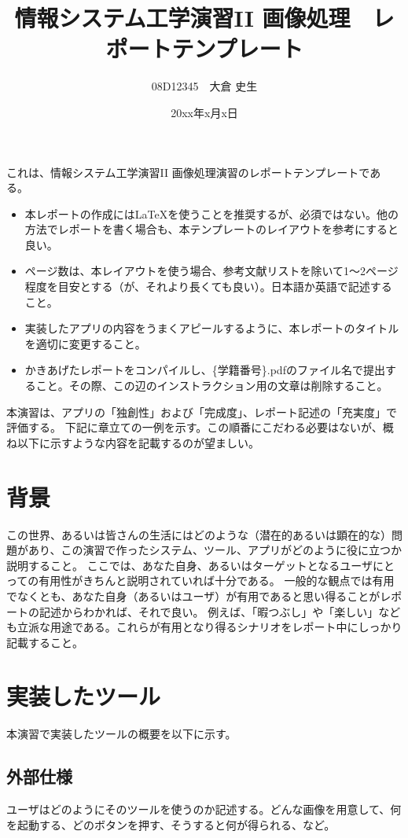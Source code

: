 \documentclass[twocolumn, a4paper]{jsarticle}
\begin{document}
\title{情報システム工学演習II 画像処理　レポートテンプレート}
\author{08D12345　大倉 史生}
\date{20xx年x月x日} 
\twocolumn[
\maketitle
]

これは、情報システム工学演習II 画像処理演習のレポートテンプレートである。
\begin{itemize}
\item 本レポートの作成には\LaTeX を使うことを推奨するが、必須ではない。他の方法でレポートを書く場合も、本テンプレートのレイアウトを参考にすると良い。
\item ページ数は、本レイアウトを使う場合、参考文献リストを除いて1～2ページ程度を目安とする（が、それより長くても良い）。日本語か英語で記述すること。
\item 実装したアプリの内容をうまくアピールするように、本レポートのタイトルを適切に変更すること。
\item かきあげたレポートをコンパイルし、\{学籍番号\}.pdfのファイル名で提出すること。その際、この辺のインストラクション用の文章は削除すること。
\end{itemize}
本演習は、アプリの「独創性」および「完成度」、レポート記述の「充実度」で評価する。
下記に章立ての一例を示す。この順番にこだわる必要はないが、概ね以下に示すような内容を記載するのが望ましい。

\section{背景}
この世界、あるいは皆さんの生活にはどのような（潜在的あるいは顕在的な）問題があり、この演習で作ったシステム、ツール、アプリがどのように役に立つか説明すること。
ここでは、あなた自身、あるいはターゲットとなるユーザにとっての有用性がきちんと説明されていれば十分である。
一般的な観点では有用でなくとも、あなた自身（あるいはユーザ）が有用であると思い得ることがレポートの記述からわかれば、それで良い。
例えば、「暇つぶし」や「楽しい」なども立派な用途である。これらが有用となり得るシナリオをレポート中にしっかり記載すること。

\section{実装したツール}
本演習で実装したツールの概要を以下に示す。

\subsection{外部仕様}
ユーザはどのようにそのツールを使うのか記述する。どんな画像を用意して、何を起動する、どのボタンを押す、そうすると何が得られる、など。
\end{document}
